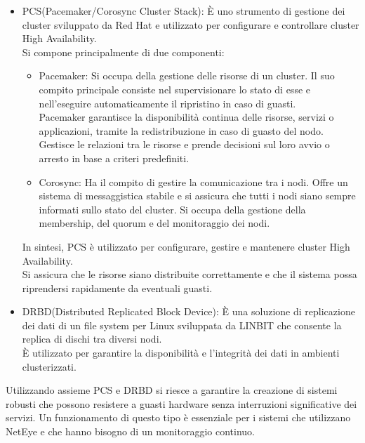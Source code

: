 \begin{itemize}
  \item PCS(Pacemaker/Corosync Cluster Stack): È uno strumento di gestione dei cluster
    sviluppato da Red Hat e utilizzato per configurare e controllare cluster High
    Availability.\\ Si compone principalmente di due componenti:
    \begin{itemize}
      \item Pacemaker: Si occupa della gestione delle risorse di un cluster. Il suo
        compito principale consiste nel supervisionare lo stato di esse e nell'eseguire
        automaticamente il ripristino in caso di guasti.\\ Pacemaker garantisce la
        disponibilità continua delle risorse, servizi o applicazioni, tramite la
        redistribuzione in caso di guasto del nodo. Gestisce le relazioni tra le
        risorse e prende decisioni sul loro avvio o arresto in base a criteri
        predefiniti.

      \item Corosync: Ha il compito di gestire la comunicazione tra i nodi. Offre
        un sistema di messaggistica stabile e si assicura che tutti i nodi siano
        sempre informati sullo stato del cluster. Si occupa della gestione della
        membership, del quorum e del monitoraggio dei nodi.
    \end{itemize}
    In sintesi, PCS è utilizzato per configurare, gestire e mantenere cluster
    High Availability.\\ Si assicura che le risorse siano distribuite
    correttamente e che il sistema possa riprendersi rapidamente da eventuali
    guasti.

  \item DRBD(Distributed Replicated Block Device): È una soluzione di replicazione
    dei dati di un file system per Linux sviluppata da LINBIT che consente la replica
    di dischi tra diversi nodi.\\ È utilizzato per garantire la disponibilità e l'integrità
    dei dati in ambienti clusterizzati.
\end{itemize}
Utilizzando assieme PCS e DRBD si riesce a garantire la creazione di sistemi
robusti che possono resistere a guasti hardware senza interruzioni significative
dei servizi. Un funzionamento di questo tipo è essenziale per i sistemi che utilizzano
NetEye e che hanno bisogno di un monitoraggio continuo.